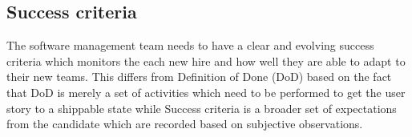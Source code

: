 \documentclass[12pt,conference]{IEEEtran}
\begin{document}
\subsection*{Success criteria} The software management team needs to have a clear and evolving success criteria which monitors the each new hire and how well they are able to adapt to their new teams. This differs from Definition of Done (DoD) based on the fact that DoD is merely a set of activities which need to be performed to get the user story to a shippable state while Success criteria is a broader set of expectations from the candidate which are recorded based on subjective observations. 








\end{document}
